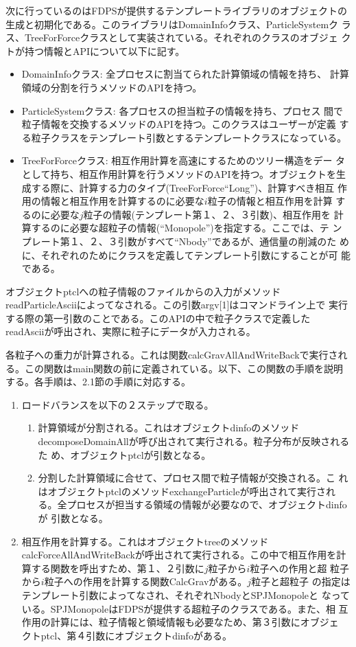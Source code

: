 \documentclass[12pt,a4paper]{jarticle}
\begin{document}
次に行っているのはFDPSが提供するテンプレートライブラリのオブジェクトの
生成と初期化である。このライブラリはDomainInfoクラス、ParticleSystemク
ラス、TreeForForceクラスとして実装されている。それぞれのクラスのオブジェ
クトが持つ情報とAPIについて以下に記す。
\begin{itemize}
\item DomainInfoクラス: 全プロセスに割当てられた計算領域の情報を持ち、
  計算領域の分割を行うメソッドのAPIを持つ。
\item ParticleSystemクラス: 各プロセスの担当粒子の情報を持ち、プロセス
  間で粒子情報を交換するメソッドのAPIを持つ。このクラスはユーザーが定義
  する粒子クラスをテンプレート引数とするテンプレートクラスになっている。
\item TreeForForceクラス: 相互作用計算を高速にするためのツリー構造をデー
  タとして持ち、相互作用計算を行うメソッドのAPIを持つ。オブジェクトを生
  成する際に、計算する力のタイプ(TreeForForce``Long'')、計算すべき相互
  作用の情報と相互作用を計算するのに必要な$i$粒子の情報と相互作用を計算
  するのに必要な$j$粒子の情報(テンプレート第１、２、３引数)、相互作用を
  計算するのに必要な超粒子の情報(``Monopole'')を指定する。ここでは、テ
  ンプレート第１、２、３引数がすべて``Nbody''であるが、通信量の削減のた
  めに、それぞれのためにクラスを定義してテンプレート引数にすることが可
  能である。
\end{itemize}

オブジェクトptclへの粒子情報のファイルからの入力がメソッド
readParticleAsciiによってなされる。この引数argv[1]はコマンドライン上で
実行する際の第一引数のことである。このAPIの中で粒子クラスで定義した
readAsciiが呼出され、実際に粒子にデータが入力される。

各粒子への重力が計算される。これは関数calcGravAllAndWriteBackで実行され
る。この関数はmain関数の前に定義されている。以下、この関数の手順を説明
する。各手順は、2.1節の手順に対応する。
\begin{enumerate}
\item ロードバランスを以下の２ステップで取る。
  \begin{enumerate}
  \item 計算領域が分割される。これはオブジェクトdinfoのメソッド
    decomposeDomainAllが呼び出されて実行される。粒子分布が反映されるた
    め、オブジェクトptclが引数となる。
  \item 分割した計算領域に合せて、プロセス間で粒子情報が交換される。こ
    れはオブジェクトptclのメソッドexchangeParticleが呼出されて実行され
    る。全プロセスが担当する領域の情報が必要なので、オブジェクトdinfoが
    引数となる。
  \end{enumerate}
\item 相互作用を計算する。これはオブジェクトtreeのメソッド
  calcForceAllAndWriteBackが呼出されて実行される。この中で相互作用を計
  算する関数を呼出すため、第１、２引数に$j$粒子から$i$粒子への作用と超
  粒子から$i$粒子への作用を計算する関数CalcGravがある。$j$粒子と超粒子
  の指定はテンプレート引数によってなされ、それぞれNbodyとSPJMonopoleと
  なっている。SPJMonopoleはFDPSが提供する超粒子のクラスである。また、相
  互作用の計算には、粒子情報と領域情報も必要なため、第３引数にオブジェ
  クトptcl、第４引数にオブジェクトdinfoがある。
\end{enumerate}
\end{document}
